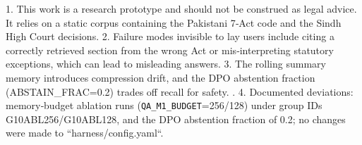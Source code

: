 
1. This work is a research prototype and should not be construed as legal advice. It relies on a static corpus containing the Pakistani 7‑Act code and the Sindh High Court decisions.
2. Failure modes invisible to lay users include citing a correctly retrieved section from the wrong Act or mis‑interpreting statutory exceptions, which can lead to misleading answers.
3. The rolling summary memory introduces compression drift, and the DPO abstention fraction (ABSTAIN_FRAC=0.2) trades off recall for safety. .
4. Documented deviations: memory‑budget ablation runs (\texttt{QA\_M1\_BUDGET}=256/128) under group IDs G10ABL256/G10ABL128, and the DPO abstention fraction of 0.2; no changes were made to ``harness/config.yaml``.

